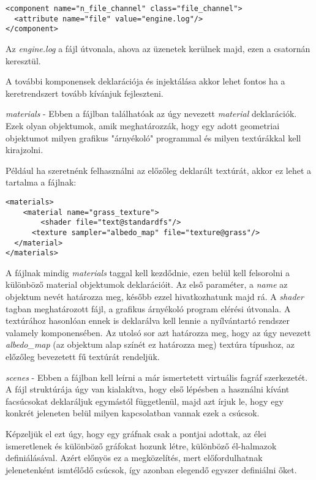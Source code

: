 \begin{description}
\begin{lstlisting}
<component name="n_file_channel" class="file_channel">
  <attribute name="file" value="engine.log"/>
</component>
\end{lstlisting}

Az \textit{engine.log} a fájl útvonala, ahova az üzenetek kerülnek majd, ezen a csatornán keresztül.

A további komponensek deklarációja és injektálása akkor lehet fontos ha a keretrendszert tovább kívánjuk fejleszteni.

\item \textit{materials} - Ebben a fájlban találhatóak az úgy nevezett \textit{material} deklarációk. Ezek olyan objektumok, amik meghatározzák, hogy egy adott geometriai objektumot milyen grafikus "árnyékoló" programmal és milyen textúrákkal kell kirajzolni.

Például ha szeretnénk felhasználni az előzőleg deklarált textúrát, akkor ez lehet a tartalma a fájlnak:

\begin{lstlisting}
<materials>
	<material name="grass_texture">
		<shader file="text@standardfs"/>
	  <texture sampler="albedo_map" file="texture@grass"/>
  </material>
</materials>
\end{lstlisting}

A fájlnak mindig \textit{materials} taggal kell kezdődnie, ezen belül kell felsorolni a különböző material objektumok deklarációit. Az első paraméter, a \textit{name} az objektum nevét határozza meg, később ezzel hivatkozhatunk majd rá. A \textit{shader} tagban meghatározott fájl, a grafikus árnyékoló program elérési útvonala. A textúrához hasonlóan ennek is deklarálva kell lennie a nyílvántartó rendszer valamely komponensében. Az utolsó sor azt határozza meg, hogy az úgy nevezett \textit{albedo_map} (az objektum alap színét ez határozza meg) textúra típushoz, az előzőleg bevezetett fű textúrát rendeljük.

\item \textit{scenes} - Ebben a fájlban kell leírni a már ismertetett virtuális fagráf szerkezetét. A fájl struktúrája úgy van kialakítva, hogy első lépésben a használni kívánt facsúcsokat deklaráljuk egymástól függetlenül, majd azt írjuk le, hogy egy konkrét jeleneten belül milyen kapcsolatban vannak ezek a csúcsok.

Képzeljük el ezt úgy, hogy egy gráfnak csak a pontjai adottak, az élei ismeretlenek és különböző gráfokat hozunk létre, különböző él-halmazok definiálásával. Azért előnyös ez a megközelítés, mert előfordulhatnak jelenetenként ismtélődő csúcsok, így azonban elegendő egyszer definiálni őket.


\end{description}
